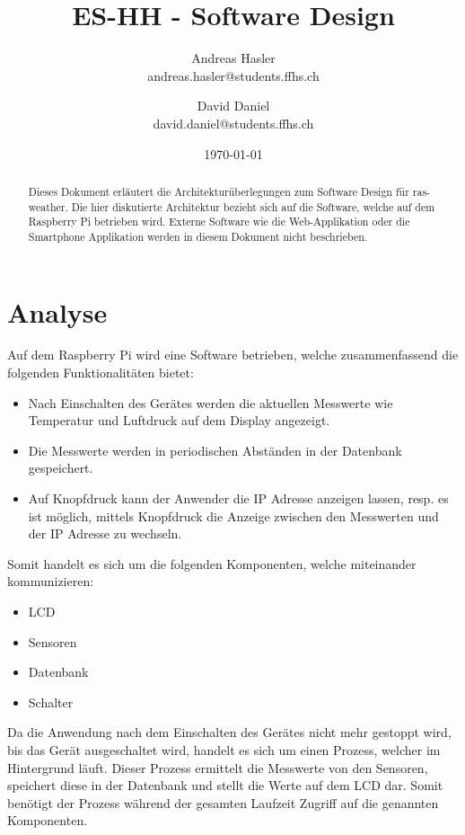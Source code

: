 \documentclass[
    10pt,
    a4paper,
]{scrartcl}
\title{ES-HH - Software Design}
\author{Andreas Hasler \\{\small andreas.hasler@students.ffhs.ch}
\and David Daniel\\{\small david.daniel@students.ffhs.ch}}
\date{\today}
\begin{document}
\maketitle
{}%

\begin{abstract}
    Dieses Dokument erläutert die Architekturüberlegungen zum Software Design für
    ras-weather. Die hier diskutierte Architektur bezieht sich auf die Software, welche
    auf dem Raspberry Pi betrieben wird. Externe Software wie die Web-Applikation oder die
    Smartphone Applikation werden in diesem Dokument nicht beschrieben.
\end{abstract}

\clearpage
{}%
\tableofcontents

\section{Analyse}

Auf dem Raspberry Pi wird eine Software betrieben, welche zusammenfassend
\cite{project-doc} die folgenden Funktionalitäten bietet:
\begin{itemize}
    \item Nach Einschalten des Gerätes werden die aktuellen Messwerte wie Temperatur und
        Luftdruck auf dem Display angezeigt.
    \item Die Messwerte werden in periodischen Abständen in der Datenbank gespeichert.
    \item Auf Knopfdruck kann der Anwender die IP Adresse anzeigen lassen, resp. es ist
        möglich, mittels Knopfdruck die Anzeige zwischen den Messwerten und der IP Adresse
        zu wechseln.
\end{itemize}

Somit handelt es sich um die folgenden Komponenten, welche miteinander kommunizieren:

\begin{itemize}
    \item LCD
    \item Sensoren
    \item Datenbank
    \item Schalter
\end{itemize}

Da die Anwendung nach dem Einschalten des Gerätes nicht mehr gestoppt wird, bis das Gerät
ausgeschaltet wird, handelt es sich um einen Prozess, welcher im Hintergrund läuft. Dieser
Prozess ermittelt die Messwerte von den Sensoren, speichert diese in der Datenbank und
stellt die Werte auf dem LCD dar. Somit benötigt der Prozess während der gesamten Laufzeit
Zugriff auf die genannten Komponenten.
\end{document}
